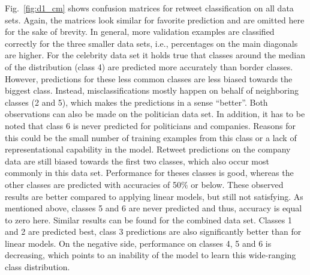 Fig.~\ref{fig:d1_cm} shows confusion matrices for retweet classification on all
data sets.
Again, the matrices look similar for favorite prediction and are omitted
here for the sake of brevity.
In general, more validation examples are classified correctly for the three
smaller data sets, i.e., percentages on the main diagonals are higher.
For the celebrity data set it holds true that classes around the median of the
distribution (class 4) are predicted more accurately than border classes.
However, predictions for these less common classes are less biased towards
the biggest class.
Instead, misclassifications mostly happen on behalf of neighboring classes (2 and 5),
which makes the predictions in a sense ``better''.
Both observations can also be made on the politician data set.
In addition, it has to be noted that class 6 is never predicted for politicians
and companies.
Reasons for this could be the small number of training examples from this class
or a lack of representational capability in the model.
Retweet predictions on the company data are still biased towards the first
two classes, which also occur most commonly in this data set.
Performance for theses classes is good, whereas the other classes are predicted
with accuracies of 50\% or below.
These observed results are better compared to applying linear models, but still
not satisfying.
As mentioned above, classes 5 and 6 are never predicted and thus, accuracy is
equal to zero here.
Similar results can be found for the combined data set.
Classes 1 and 2 are predicted best, class 3 predictions are also significantly
better than for linear models.
On the negative side, performance on classes 4, 5 and 6 is decreasing, which
points to an inability of the model to learn this wide-ranging class
distribution.

